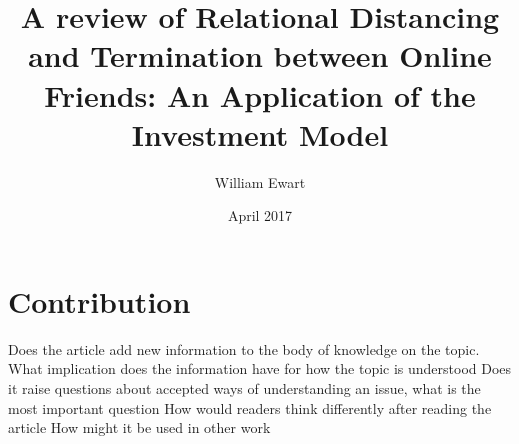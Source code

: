 \documentclass[12pt]{article}
\title{A review of Relational Distancing and Termination between Online Friends: An Application of the Investment Model}
\author{William Ewart}
\date{April 2017}
\begin{document}
\begin{titlingpage}
\maketitle
\tableofcontents
\end{titlingpage}
\newpage
\section{Contribution}
Does the article add new information to the body of knowledge on the topic. What implication does the information have for how the topic is understood
Does it raise questions about accepted ways of understanding an issue, what is the most important question
How would readers think differently after reading the article
How might it be used in other work
\end{document}
